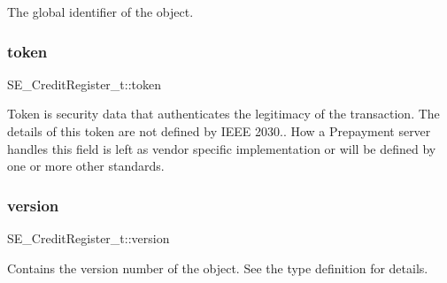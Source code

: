 The global identifier of the object. \mbox{\label{group__CreditRegister_ga360e14671fe75ee6b62e1034f2045ee9}} 
\subsubsection{\texorpdfstring{token}{token}}
{\footnotesize\ttfamily S\+E\+\_\+\+Credit\+Register\+\_\+t\+::token}

Token is security data that authenticates the legitimacy of the transaction. The details of this token are not defined by I\+E\+EE 2030.. How a Prepayment server handles this field is left as vendor specific implementation or will be defined by one or more other standards. \mbox{\label{group__CreditRegister_gae291a84e122c89e218a4a85dc5be4cb7}} 
\subsubsection{\texorpdfstring{version}{version}}
{\footnotesize\ttfamily S\+E\+\_\+\+Credit\+Register\+\_\+t\+::version}

Contains the version number of the object. See the type definition for details. 